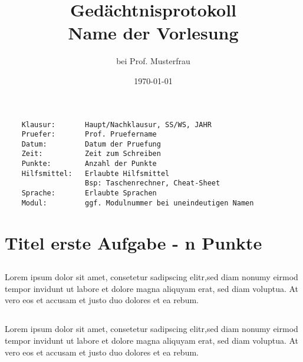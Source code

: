 \documentclass[a4paper]{article}
\begin{document}
	\author{bei Prof. Musterfrau\\}
	\title{\vspace{-2cm}Gedächtnisprotokoll\\Name der Vorlesung}
	\date{\today{}} 
	\maketitle{} %
	\vspace{-1cm}
	\begin{lstlisting}
	Klausur:       Haupt/Nachklausur, SS/WS, JAHR
	Pruefer:       Prof. Pruefername
	Datum:         Datum der Pruefung
	Zeit:          Zeit zum Schreiben
	Punkte:		   Anzahl der Punkte
	Hilfsmittel:   Erlaubte Hilfsmittel
	               Bsp: Taschenrechner, Cheat-Sheet
	Sprache:	   Erlaubte Sprachen
	Modul:		   ggf. Modulnummer bei uneindeutigen Namen
	\end{lstlisting}
	
	\section{Titel erste Aufgabe - n Punkte}
	\subsection{}
	Lorem ipsum dolor sit amet, consetetur sadipscing elitr,sed diam nonumy eirmod tempor invidunt ut labore et dolore magna aliquyam erat, sed diam voluptua.
	At vero eos et accusam et justo duo dolores et ea rebum.

	\subsection{}
	Lorem ipsum dolor sit amet, consetetur sadipscing elitr,sed diam nonumy eirmod tempor invidunt ut labore et dolore magna aliquyam erat, sed diam voluptua.
	At vero eos et accusam et justo duo dolores et ea rebum.
\end{document}

